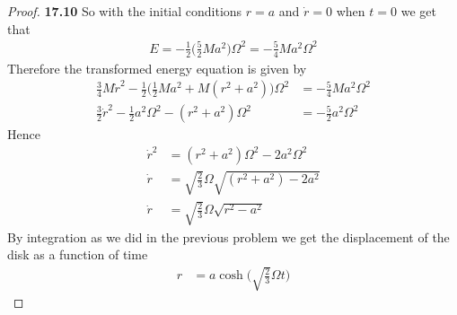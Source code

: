 \documentclass[11pt]{article}
\theoremstyle{definition}
\begin{document}
\begin{proof}{\textbf{17.10}}
    So with the initial conditions $r = a$ and $\dot r = 0$ when $t=0$ we get
    that
    \begin{align*}
        E = - \frac{1}{2}\bigg(\frac{5}{2}Ma^2\bigg)\Omega^2
        = - \frac{5}{4}Ma^2\Omega^2
    \end{align*}
    Therefore the transformed energy equation is given by
    \begin{align*}
        \frac{3}{4}M\dot r^2
        - \frac{1}{2}\bigg(\frac{1}{2}Ma^2 + M(r^2 + a^2)\bigg)\Omega^2
        &= - \frac{5}{4}Ma^2\Omega^2\\
        \frac{3}{2}\dot r^2
        - \frac{1}{2}a^2\Omega^2 - (r^2 + a^2)\Omega^2
        &= - \frac{5}{2}a^2\Omega^2
    \end{align*}
    Hence
    \begin{align*}
        \dot r^2&= (r^2 + a^2)\Omega^2 - 2a^2\Omega^2\\
        \dot r &= \sqrt{\frac{2}{3}}\Omega\sqrt{(r^2 + a^2) - 2a^2}\\
        \dot r &= \sqrt{\frac{2}{3}}\Omega\sqrt{r^2 - a^2}
    \end{align*}
    By integration as we did in the previous problem we get the displacement
    of the disk as a function of time
    \begin{align*}
        r &= a\cosh\bigg(\sqrt{\frac{2}{3}}\Omega t\bigg)
    \end{align*}
\end{proof}
\cleardoublepage
\end{document}
